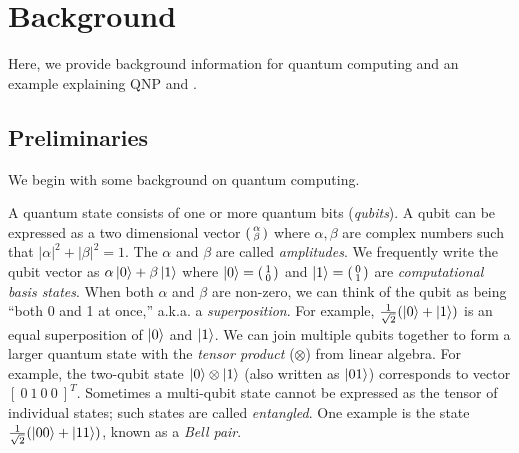 \section{Background}
\label{sec:background}

Here, we provide background information for quantum computing and an example explaining QNP and \qafny.

\subsection{Preliminaries}

We begin with some background on quantum computing. 

 A quantum state consists of one or more quantum bits (\emph{qubits}). A qubit can be expressed as a two dimensional vector $\begin{psmallmatrix} \alpha \\ \beta \end{psmallmatrix}$ where $\alpha,\beta$ are complex numbers such that $|\alpha|^2 + |\beta|^2 = 1$.  The $\alpha$ and $\beta$ are called \emph{amplitudes}. 
%
We frequently write the qubit vector as $\alpha\left\vert{0}\right\rangle + \beta\left\vert{1}\right\rangle$ where $\left\vert{0}\right\rangle = \begin{psmallmatrix} 1 \\ 0 \end{psmallmatrix}$ and $\left\vert{1}\right\rangle = \begin{psmallmatrix} 0 \\ 1 \end{psmallmatrix}$ are \emph{computational basis states}. When both $\alpha$ and $\beta$ are non-zero, we can think of the qubit as being ``both 0 and 1 at once,'' a.k.a. a \emph{superposition}. For example, $\frac{1}{\sqrt{2}}(\left\vert{0}\right\rangle + \left\vert{1}\right\rangle)$ is an equal superposition of $\left\vert{0}\right\rangle$ and $\left\vert{1}\right\rangle$. 
We can join multiple qubits together to form a larger quantum state with the \emph{tensor product} ($\otimes$) from linear algebra. For example, the two-qubit state $\left\vert{0}\right\rangle \otimes \left\vert{1}\right\rangle$ (also written as $\left\vert{01}\right\rangle$) corresponds to vector $[~0~1~0~0~]^T$. 
Sometimes a multi-qubit state cannot be expressed as the tensor of individual states; such states are called \emph{entangled}. One example is the state $\frac{1}{\sqrt{2}}(\left\vert{00}\right\rangle + \left\vert{11}\right\rangle)$, known as a \emph{Bell pair}.

